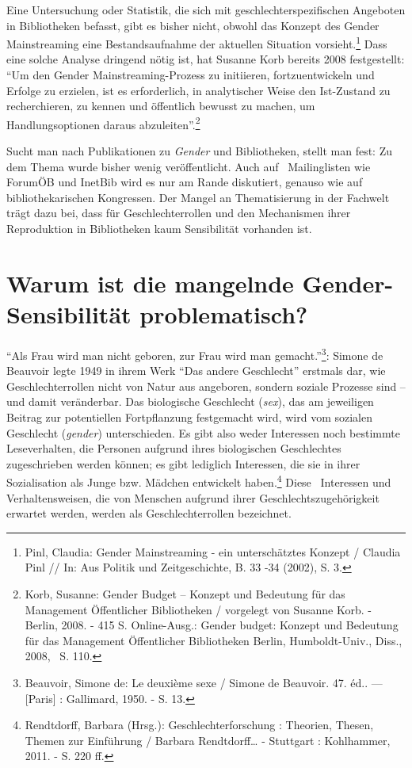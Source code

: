 \documentclass[a4paper,
fontsize=11pt,
oneside,
numbers=noperiodatend,
parskip=half-,
bibliography=totoc,
final
]{scrartcl}
\begin{document}
Eine Untersuchung oder Statistik, die sich mit geschlechterspezifischen
Angeboten in Bibliotheken befasst, gibt es bisher nicht, obwohl das
Konzept des Gender Mainstreaming eine Bestandsaufnahme der aktuellen
Situation vorsieht.\footnote{Pinl, Claudia: Gender Mainstreaming - ein
  unterschätztes Konzept / Claudia Pinl // In: Aus Politik und
  Zeitgeschichte, B. 33 -34 (2002), S. 3.} Dass eine solche Analyse
dringend nötig ist, hat Susanne Korb bereits 2008 festgestellt:
\enquote{Um den Gender Mainstreaming-Prozess zu initiieren,
fortzuentwickeln und Erfolge zu erzielen, ist es erforderlich, in
analytischer Weise den Ist-Zustand zu recherchieren, zu kennen und
öffentlich bewusst zu machen, um Handlungsoptionen daraus
abzuleiten}.\footnote{Korb, Susanne: Gender Budget -- Konzept und
  Bedeutung für das Management Öffentlicher Bibliotheken / vorgelegt von
  Susanne Korb. - Berlin, 2008. - 415 S. Online-Ausg.: Gender budget:
  Konzept und Bedeutung für das Management Öffentlicher Bibliotheken
  Berlin, Humboldt-Univ., Diss., 2008,~ S. 110.}

Sucht man nach Publikationen zu \emph{Gender} und Bibliotheken, stellt
man fest: Zu dem Thema wurde bisher wenig veröffentlicht. Auch auf~
Mailinglisten wie ForumÖB und InetBib wird es nur am Rande diskutiert,
genauso wie auf bibliothekarischen Kongressen. Der Mangel an
Thematisierung in der Fachwelt trägt dazu bei, dass für
Geschlechterrollen und den Mechanismen ihrer Reproduktion in
Bibliotheken kaum Sensibilität vorhanden ist.

\section*{Warum ist die mangelnde Gender-Sensibilität
problematisch?}\label{warum-ist-die-mangelnde-gender-sensibilituxe4t-problematisch}

\enquote{Als Frau wird man nicht geboren, zur Frau wird man
gemacht.}\footnote{Beauvoir, Simone de: Le deuxième sexe / Simone de
  Beauvoir. 47. éd.. --- {[}Paris{]} : Gallimard, 1950. - S. 13.}:
Simone de Beauvoir legte 1949 in ihrem Werk \enquote{Das andere
Geschlecht} erstmals dar, wie Geschlechterrollen nicht von Natur aus
angeboren, sondern soziale Prozesse sind -- und damit veränderbar. Das
biologische Geschlecht (\emph{sex}), das am jeweiligen Beitrag zur
potentiellen Fortpflanzung festgemacht wird, wird vom sozialen
Geschlecht (\emph{gender}) unterschieden. Es gibt also weder Interessen
noch bestimmte Leseverhalten, die Personen aufgrund ihres biologischen
Geschlechtes zugeschrieben werden können; es gibt lediglich Interessen,
die sie in ihrer Sozialisation als Junge bzw. Mädchen entwickelt
haben.\footnote{Rendtdorff, Barbara (Hrsg.): Geschlechterforschung :
  Theorien, Thesen, Themen zur Einführung / Barbara Rendtdorff\ldots{} -
  Stuttgart : Kohlhammer, 2011. - S. 220 ff.} Diese~ Interessen und
Verhaltensweisen, die von Menschen aufgrund ihrer
Geschlechtszugehörigkeit erwartet werden, werden als Geschlechterrollen
bezeichnet.
\end{document}
